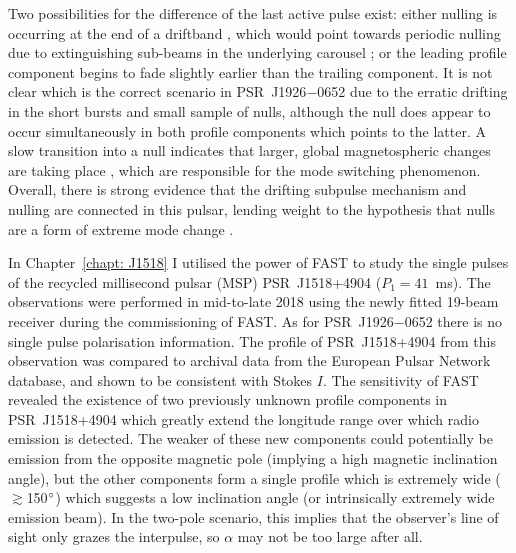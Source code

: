 Two possibilities for the difference of the last active pulse exist: either nulling is occurring at the end of a driftband \citep[as was observed for PSR~J1840$-$0840 by][]{GYY+2017}, which would point towards periodic nulling due to extinguishing sub-beams in the underlying carousel \citep[e.g.][]{HRxx2007, HRxx2009}; or the leading profile component begins to fade slightly earlier than the trailing component. It is not clear which is the correct scenario in PSR~J1926$-$0652 due to the erratic drifting in the short bursts and small sample of nulls, although the null does appear to occur simultaneously in both profile components which points to the latter. A slow transition into a null \citep[and slow recovery, as seen in PSR~B1944+17 by][]{DCHR1986} indicates that larger, global magnetospheric changes are taking place \citep{LHK+2010,MYxx2014}, which are responsible for the mode switching phenomenon. Overall, there is strong evidence that the drifting subpulse mechanism and nulling are connected in this pulsar, lending weight to the hypothesis that nulls are a form of extreme mode change \citep[e.g.][]{LKR+2002,WMJx2007, Txxx2010}.











In Chapter~\ref{chapt: J1518} I utilised the power of FAST to study the single pulses of the recycled millisecond pulsar (MSP) PSR~J1518+4904 ($P_1 = 41$~ms). The observations were performed in mid-to-late 2018 using the newly fitted 19-beam receiver during the commissioning of FAST. As for PSR~J1926$-$0652 there is no single pulse polarisation information. The profile of PSR~J1518+4904 from this observation was compared to archival data from the European Pulsar Network database, and shown to be consistent with Stokes $I$. The sensitivity of FAST revealed the existence of two previously unknown profile components in PSR~J1518+4904 which greatly extend the longitude range over which radio emission is detected. The weaker of these new components could potentially be emission from the opposite magnetic pole (implying a high magnetic inclination angle), but the other components form a single profile which is extremely wide ($\gtrsim$150$^\circ$) which suggests a low inclination angle (or intrinsically extremely wide emission beam). In the two-pole scenario, this implies that the observer's line of sight only grazes the interpulse, so $\alpha$ may not be too large after all. 

